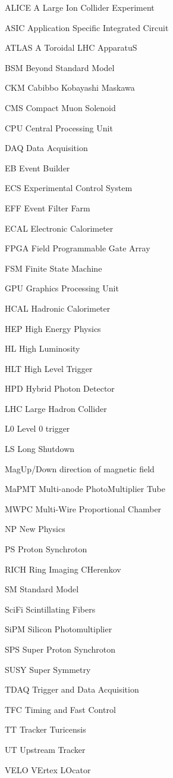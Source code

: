 \begin{abbreviations}
    \item[ALICE] A Large Ion Collider Experiment
    \item[ASIC] Application Specific Integrated Circuit
    \item[ATLAS] A Toroidal LHC ApparatuS
    \item[BSM] Beyond Standard Model
    \item[CKM] Cabibbo Kobayashi Maskawa
    \item[CMS] Compact Muon Solenoid
    \item[CPU] Central Processing Unit
    \item[DAQ] Data Acquisition
    \item[EB] Event Builder
    \item[ECS] Experimental Control System
    \item[EFF] Event Filter Farm
    \item[ECAL] Electronic Calorimeter
    \item[FPGA] Field Programmable Gate Array
    \item[FSM] Finite State Machine
    \item[GPU] Graphics Processing Unit
    \item[HCAL] Hadronic Calorimeter
    \item[HEP] High Energy Physics
    \item[HL] High Luminosity
    \item[HLT] High Level Trigger
    \item[HPD] Hybrid Photon Detector
    \item[LHC] Large Hadron Collider
    \item[L0] Level 0 trigger
    \item[LS] Long Shutdown
    \item[MagUp/Down] direction of magnetic field
    \item[MaPMT] Multi-anode PhotoMultiplier Tube
    \item[MWPC] Multi-Wire Proportional Chamber
    \item[NP] New Physics
    \item[PS] Proton Synchroton
    \item[RICH] Ring Imaging CHerenkov
    \item[SM] Standard Model
    \item[SciFi] Scintillating Fibers
    \item[SiPM] Silicon Photomultiplier
    \item[SPS] Super Proton Synchroton
    \item[SUSY] Super Symmetry
    \item[TDAQ] Trigger and Data Acquisition
    \item[TFC] Timing and Fast Control
    
    \item[TT] Tracker Turicensis
    \item[UT] Upstream Tracker
    \item[VELO] VErtex LOcator
\end{abbreviations}

